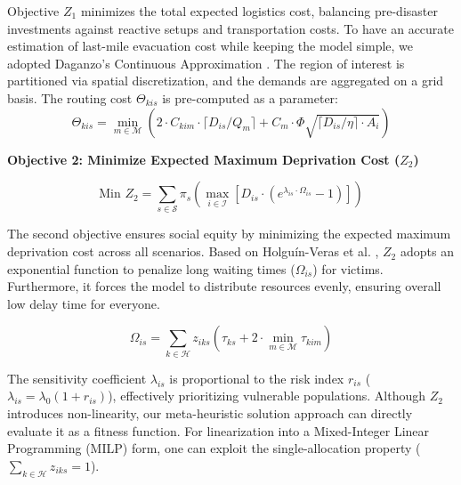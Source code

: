 \documentclass{llncs}
\begin{document}
Objective $Z_1$ minimizes the total expected logistics cost, balancing pre-disaster investments against reactive setups and transportation costs. To have an accurate estimation of last-mile evacuation cost while keeping the model simple, we adopted Daganzo's Continuous Approximation \cite{daganzo2005logistics}. The region of interest is partitioned via spatial discretization, and the demands are aggregated on a grid basis. The routing cost $\Theta_{kis}$ is pre-computed as a parameter:
\begin{equation*} \label{eq:daganzo_theta}
    \Theta_{kis} = \min_{m \in \mathcal{M}} \left( 2 \cdot C_{kim} \cdot \lceil D_{is}/Q_m \rceil + C_{m} \cdot \Phi \sqrt{\lceil D_{is}/\eta \rceil \cdot A_i} \right)
\end{equation*}

\textbf{ Objective 2: Minimize Expected Maximum Deprivation Cost ($Z_2$)}


\begin{equation} \label{eq:obj2}
    \text{Min } Z_2 = \sum_{s \in \mathcal{S}} \pi_s \left( \max_{i \in \mathcal{I}} \left[ D_{is} \cdot \left( e^{\lambda_{is} \cdot \Omega_{is}} - 1 \right) \right] \right)
\end{equation}

The second objective ensures social equity by minimizing the expected maximum deprivation cost across all scenarios. Based on Holguín-Veras et al. \cite{holguin2013appropriate}, $Z_2$ adopts an exponential function to penalize long waiting times ($\Omega_{is}$) for victims. Furthermore, it forces the model to distribute resources evenly, ensuring overall low delay time for everyone.

\begin{equation*} \label{eq:waiting_time}
\Omega_{is} = \sum_{k \in \mathcal{H}} z_{iks} \left( \tau_{ks} + 2 \cdot \min_{m \in \mathcal{M}} \tau_{kim} \right)
\end{equation*}

The sensitivity coefficient $\lambda_{is}$ is proportional to the risk index $r_{is}$ ($\lambda_{is} = \lambda_0(1 + r_{is})$), effectively prioritizing vulnerable populations. Although $Z_2$ introduces non-linearity, our meta-heuristic solution approach can directly evaluate it as a fitness function. For linearization into a Mixed-Integer Linear Programming (MILP) form, one can exploit the single-allocation property ($\sum_{k \in \mathcal{H}} z_{iks} = 1$).
\end{document}
